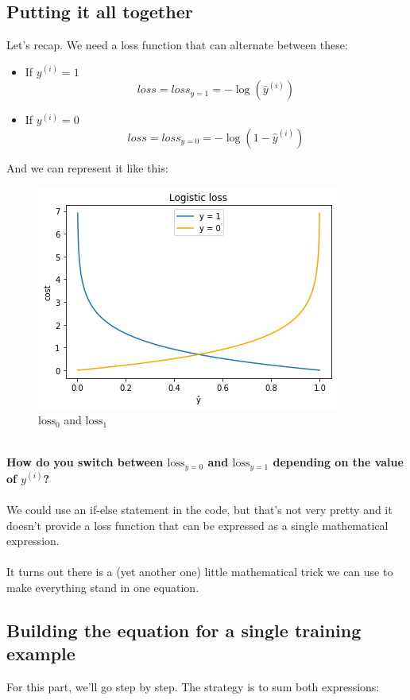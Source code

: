 \subsection*{Putting it all together}
Let's recap. We need a loss function that can alternate between these:\\
\begin{itemize}
    \item If $y^{(i)} = 1$
          $$
          loss = loss_{y=1} = -\log(\hat{y}^{(i)})
          $$
    
    \item If $y^{(i)} = 0$
          $$
          loss = loss_{y=0} = -\log(1- \hat{y}^{(i)})
          $$
\end{itemize}
\newpage
And we can represent it like this:\\
\begin{figure}[!h]
    \centering
    \includegraphics[scale=0.55]{assets/log_loss.png}
    \caption{$\text{loss}_0$ and $\text{loss}_1$}
\end{figure}
\\
\textbf{How do you switch between $\text{loss}_{y=0}$ and $\text{loss}_{y=1}$ 
depending on the value of $y^{(i)}$?}\\
\\
We could use an if-else statement in the code, but that's not very pretty
 and it doesn't provide a loss function that can be expressed as
  a single mathematical expression.\\
\\
It turns out there is a (yet another one) little mathematical trick 
we can use to make everything stand in one equation.\\

\newpage
\subsection*{Building the equation for a single training example}
For this part, we'll go step by step.
The strategy is to sum both expressions:

